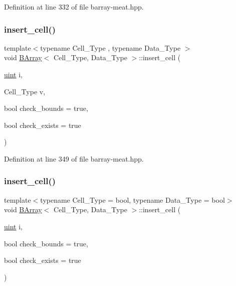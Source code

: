 Definition at line 332 of file barray-\/meat.\+hpp.

\mbox{\label{class_b_array_aeeee5972aa4301465b84dfc431fa6cf9}} 
\subsubsection{\texorpdfstring{insert\+\_\+cell()}{insert\_cell()}\hspace{0.1cm}{\footnotesize\ttfamily [5/10]}}
{\footnotesize\ttfamily template$<$typename Cell\+\_\+\+Type , typename Data\+\_\+\+Type $>$ \\
void \hyperlink{class_b_array}{B\+Array}$<$ Cell\+\_\+\+Type, Data\+\_\+\+Type $>$\+::insert\+\_\+cell (\begin{DoxyParamCaption}\item[{\hyperlink{typedefs_8hpp_a91ad9478d81a7aaf2593e8d9c3d06a14}{uint}}]{i,  }\item[{Cell\+\_\+\+Type}]{v,  }\item[{bool}]{check\+\_\+bounds = {\ttfamily true},  }\item[{bool}]{check\+\_\+exists = {\ttfamily true} }\end{DoxyParamCaption})\hspace{0.3cm}{\ttfamily [inline]}}



Definition at line 349 of file barray-\/meat.\+hpp.

\mbox{\label{class_b_array_a8e930e9e59632684e9526f499bfff0e1}} 
\subsubsection{\texorpdfstring{insert\+\_\+cell()}{insert\_cell()}\hspace{0.1cm}{\footnotesize\ttfamily [6/10]}}
{\footnotesize\ttfamily template$<$typename Cell\+\_\+\+Type = bool, typename Data\+\_\+\+Type = bool$>$ \\
void \hyperlink{class_b_array}{B\+Array}$<$ Cell\+\_\+\+Type, Data\+\_\+\+Type $>$\+::insert\+\_\+cell (\begin{DoxyParamCaption}\item[{\hyperlink{typedefs_8hpp_a91ad9478d81a7aaf2593e8d9c3d06a14}{uint}}]{i,  }\item[{bool}]{check\+\_\+bounds = {\ttfamily true},  }\item[{bool}]{check\+\_\+exists = {\ttfamily true} }\end{DoxyParamCaption})}


